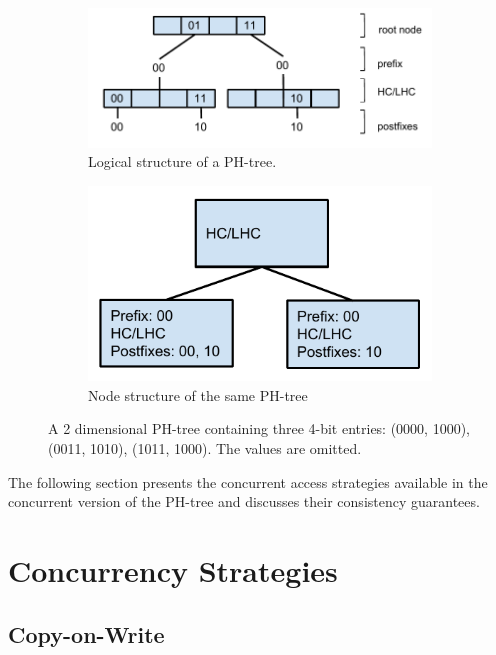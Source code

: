 \documentclass[11pt,a4paper]{globis-book}
\begin{document}
\begin{figure}
    \centering
    \begin{subfigure}[b]{0.6\linewidth}
        \includegraphics[scale=0.7]{images/PH-tree-nodes}
        \caption{Logical structure of a PH-tree.}
        \label{fig:phtree-node-1}
    \end{subfigure}%
    \begin{subfigure}[b]{0.4\linewidth}
        \includegraphics[scale=0.7]{images/PH-tree-nodes-2}
        \caption{Node structure of the same PH-tree}
        \label{fig:phtree-node-2}
    \end{subfigure}
    \label{fig:phtree-nodes}
    \caption{A 2 dimensional PH-tree containing three 4-bit entries: (0000, 1000), (0011, 1010), (1011, 1000). The values are omitted. }
\end{figure}

The following section presents the concurrent access strategies available in the concurrent version of the PH-tree and discusses their consistency guarantees.
\section{Concurrency Strategies}

\subsection{Copy-on-Write}
\end{document}
